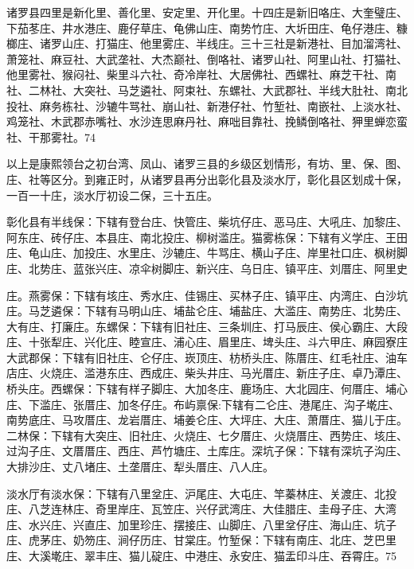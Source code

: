 诸罗县四里是新化里、善化里、安定里、开化里。十四庄是新旧咯庄、大奎璧庄、下茄苳庄、井水港庄、鹿仔草庄、龟佛山庄、南势竹庄、大圻田庄、龟仔港庄、糠榔庄、诸罗山庄、打猫庄、他里雾庄、半线庄。三十三社是新港社、目加溜湾社、萧笼社、麻豆社、大武垄社、大杰巅社、倒咯社、诸罗山社、阿里山社、打猫社、他里雾社、猴闷社、柴里斗六社、奇冷岸社、大居佛社、西螺社、麻芝干社、南社、二林社、大突社、马芝遴社、阿束社、东螺社、大武郡社、半线大肚社、南北投社、麻务栋社、沙辘牛骂社、崩山社、新港仔社、竹堑社、南嵌社、上淡水社、鸡笼社、木武郡赤嘴社、水沙连思麻丹社、麻咄目靠社、挽鳞倒咯社、狎里蝉恋蛮社、干那雾社。74

以上是康熙领台之初台湾、凤山、诸罗三县的乡级区划情形，有坊、里、保、图、庄、社等区分。到雍正时，从诸罗县再分出彰化县及淡水厅，彰化县区划成十保，一百一十庄，淡水厅初设二保，三十五庄。

彰化县有半线保：下辖有登台庄、快管庄、柴坑仔庄、恶马庄、大吼庄、加黎庄、阿东庄、砖仔庄、本县庄、南北投庄、柳树滥庄。猫雾栋保：下辖有义学庄、王田庄、龟山庄、加投庄、水里庄、沙辘庄、牛骂庄、横山子庄、岸里社口庄、枫树脚庄、北势庄、蓝张兴庄、凉伞树脚庄、新兴庄、乌日庄、镇平庄、刘厝庄、阿里史

\vfill
\begin{BookNotes}
\end{BookNotes}

\noindent 庄。燕雾保：下辖有垓庄、秀水庄、佳锡庄、买林子庄、镇平庄、内湾庄、白沙坑庄。马芝遴保：下辖有马明山庄、埔盐仑庄、埔盐庄、大滥庄、南势庄、北势庄、大有庄、打廉庄。东螺保：下辖有旧社庄、三条圳庄、打马辰庄、侯心霸庄、大段庄、十张犁庄、兴化庄、睦宣庄、浦心庄、眉里庄、埤头庄、斗六甲庄、麻园寮庄大武郡保：下辖有旧社庄、仑仔庄、崁顶庄、枋桥头庄、陈厝庄、红毛社庄、油车店庄、火烧庄、滥港东庄、西成庄、柴头井庄、马光厝庄、新庄子庄、卓乃潭庄、桥头庄。西螺保：下辖有样子脚庄、大加冬庄、鹿场庄、大北园庄、何厝庄、埔心庄、下滥庄、张厝庄、加冬仔庄。布屿禀保:下辖有二仑庄、港尾庄、沟子墘庄、南势底庄、马攻厝庄、龙岩厝庄、埔姜仑庄、大坪庄、大庄、萧厝庄、猫儿于庄。二林保：下辖有大突庄、旧社庄、火烧庄、七夕厝庄、火烧厝庄、西势庄、垓庄、过沟子庄、文厝厝庄、西庄、芦竹塘庄、土库庄。深坑子保：下辖有深坑子沟庄、大排沙庄、丈八堵庄、土垄厝庄、犁头厝庄、八人庄。

淡水厅有淡水保：下辖有八里坌庄、沪尾庄、大屯庄、竿蓁林庄、关渡庄、北投庄、八芝连林庄、奇里岸庄、瓦笠庄、兴仔武湾庄、大佳腊庄、圭母子庄、大湾庄、水兴庄、兴直庄、加里珍庄、摆接庄、山脚庄、八里坌仔庄、海山庄、坑子庄、虎茅庄、奶笏庄、涧仔历庄、甘棠庄。竹堑保：下辖有南庄、北庄、芝巴里庄、大溪墘庄、翠丰庄、猫儿碇庄、中港庄、永安庄、猫盂印斗庄、吞霄庄。75

